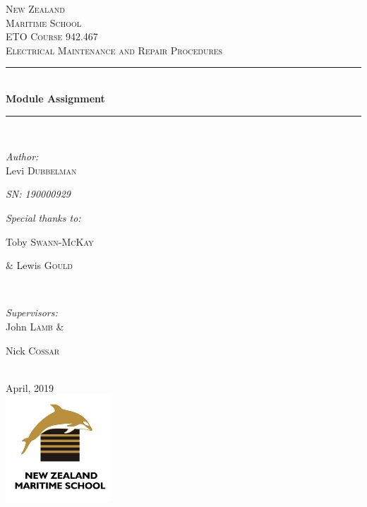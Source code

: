 \documentclass[11pt,a4paper]{article}
\begin{document}
\begin{titlepage}

\newcommand{\HRule}{\rule{\linewidth}{0.5mm}} %

\center %


\textsc{\LARGE New Zealand}\\[0.5cm]

\textsc{\LARGE  Maritime School}\\[1.5cm]
\textsc{\Large ETO Course 942.467}\\[0.2cm] %
\textsc{\large Electrical Maintenance and Repair Procedures}\\[0.5cm] %


\HRule \\[0.5cm]
{ \huge \bfseries Module Assignment}\\[0.2cm] %
\HRule \\[0.5cm]
\begin{minipage}{0.4\textwidth}
\begin{flushleft} \large
\emph{Author:}\\
Levi \textsc{Dubbelman}

\textit{SN: 190000929}\par
\textit{Special thanks to:}\par
Toby \textsc{Swann-McKay}\par
\& Lewis \textsc{Gould}
\end{flushleft}
\end{minipage}
~
\begin{minipage}{0.4\textwidth}
\begin{flushright} \large
\emph{Supervisors:} \\
John \textsc{Lamb} \&

Nick \textsc{Cossar}
\end{flushright}
\end{minipage}\\[2cm]
{\large April, 2019}\\[2cm]
\includegraphics[width=4cm]{logo.png}
\vfill

\end{titlepage}
\end{document}
